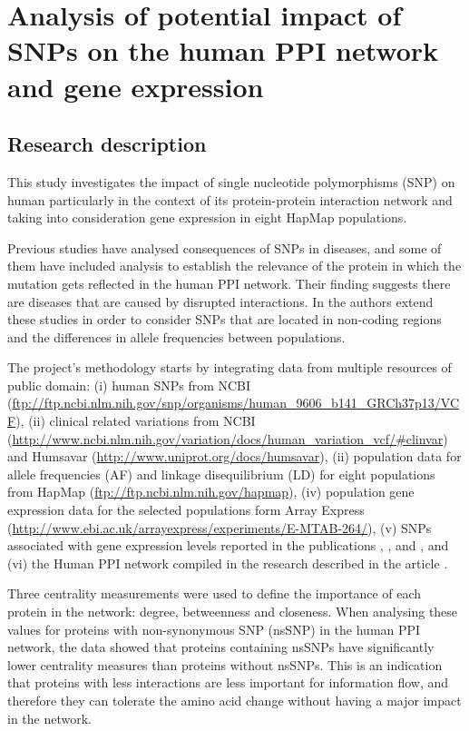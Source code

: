 \section{Analysis of potential impact of SNPs on the human PPI network and gene expression}
\label{sec:pop_genetics}
\subsection{Research description}
This study investigates the impact of single nucleotide polymorphisms (SNP) on human particularly in the context of its protein-protein interaction network and taking into consideration gene expression in eight HapMap populations.

Previous studies have analysed consequences of SNPs in diseases, and some of them have included analysis to establish the relevance of the protein in which the mutation gets reflected in the human PPI network. Their finding suggests there are diseases that are caused by disrupted interactions. In \cite{HEE2014} the authors extend these studies in order to consider SNPs that are located in non-coding regions and the differences in allele frequencies between populations.

The project's methodology starts by integrating data from multiple resources of public domain: (i) human SNPs from NCBI (\url{ftp://ftp.ncbi.nlm.nih.gov/snp/organisms/human_9606_b141_GRCh37p13/VCF}), (ii) clinical related variations from NCBI (\url{http://www.ncbi.nlm.nih.gov/variation/docs/human_variation_vcf/#clinvar}) and Humsavar (\url{http://www.uniprot.org/docs/humsavar}), (ii) population data for allele frequencies (AF) and linkage disequilibrium (LD) for eight populations from HapMap (\url{ftp://ftp.ncbi.nlm.nih.gov/hapmap}), (iv) population gene expression data for the selected populations form Array Express (\url{http://www.ebi.ac.uk/arrayexpress/experiments/E-MTAB-264/}), (v) SNPs associated with gene expression levels reported in the publications \cite{STR2007}, \cite{LAP2013}, \cite{HAU2014} and \cite{WU2013}, and (vi) the Human PPI network compiled in the research described in the article \cite{RAP2013}.

Three centrality measurements were used to define the importance of each protein in the network: degree, betweenness and closeness. When analysing these values for proteins with non-synonymous SNP (nsSNP) in the human PPI network, the data showed that proteins containing nsSNPs have significantly lower centrality measures than proteins without nsSNPs. This is an indication that proteins with less interactions are less important for information flow, and therefore they can tolerate the amino acid change without having a major impact in the network.

